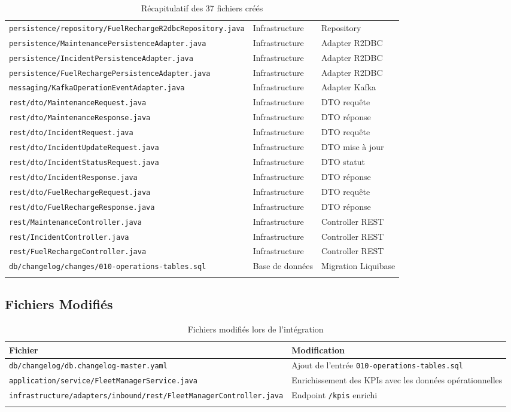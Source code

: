 \documentclass[12pt,a4paper]{report}
\begin{document}
\begin{longtable}{p{7cm}p{2cm}p{4cm}}
\texttt{persistence/repository/FuelRechargeR2dbcRepository.java} & Infrastructure & Repository \\
\texttt{persistence/MaintenancePersistenceAdapter.java} & Infrastructure & Adapter R2DBC \\
\texttt{persistence/IncidentPersistenceAdapter.java} & Infrastructure & Adapter R2DBC \\
\texttt{persistence/FuelRechargePersistenceAdapter.java} & Infrastructure & Adapter R2DBC \\
\texttt{messaging/KafkaOperationEventAdapter.java} & Infrastructure & Adapter Kafka \\
\texttt{rest/dto/MaintenanceRequest.java} & Infrastructure & DTO requête \\
\texttt{rest/dto/MaintenanceResponse.java} & Infrastructure & DTO réponse \\
\texttt{rest/dto/IncidentRequest.java} & Infrastructure & DTO requête \\
\texttt{rest/dto/IncidentUpdateRequest.java} & Infrastructure & DTO mise à jour \\
\texttt{rest/dto/IncidentStatusRequest.java} & Infrastructure & DTO statut \\
\texttt{rest/dto/IncidentResponse.java} & Infrastructure & DTO réponse \\
\texttt{rest/dto/FuelRechargeRequest.java} & Infrastructure & DTO requête \\
\texttt{rest/dto/FuelRechargeResponse.java} & Infrastructure & DTO réponse \\
\texttt{rest/MaintenanceController.java} & Infrastructure & Controller REST \\
\texttt{rest/IncidentController.java} & Infrastructure & Controller REST \\
\texttt{rest/FuelRechargeController.java} & Infrastructure & Controller REST \\
\texttt{db/changelog/changes/010-operations-tables.sql} & Base de données & Migration Liquibase \\
\bottomrule
\caption{Récapitulatif des 37 fichiers créés}
\end{longtable}

\subsection{Fichiers Modifiés}

\begin{longtable}{p{7cm}p{6cm}}
\toprule
\textbf{Fichier} & \textbf{Modification} \\
\midrule
\endhead
\texttt{db/changelog/db.changelog-master.yaml} & Ajout de l'entrée \texttt{010-operations-tables.sql} \\
\texttt{application/service/FleetManagerService.java} & Enrichissement des KPIs avec les données opérationnelles \\
\texttt{infrastructure/adapters/inbound/rest/FleetManagerController.java} & Endpoint \texttt{/kpis} enrichi \\
\bottomrule
\caption{Fichiers modifiés lors de l'intégration}
\end{longtable}
\end{document}
